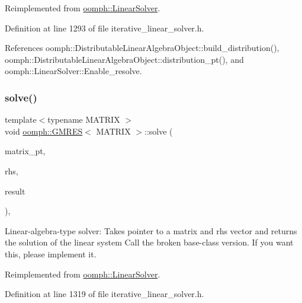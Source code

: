 Reimplemented from \hyperlink{classoomph_1_1LinearSolver_a546c09822d18191df14caed864c04c09}{oomph\+::\+Linear\+Solver}.



Definition at line 1293 of file iterative\+\_\+linear\+\_\+solver.\+h.



References oomph\+::\+Distributable\+Linear\+Algebra\+Object\+::build\+\_\+distribution(), oomph\+::\+Distributable\+Linear\+Algebra\+Object\+::distribution\+\_\+pt(), and oomph\+::\+Linear\+Solver\+::\+Enable\+\_\+resolve.

\mbox{\label{classoomph_1_1GMRES_ab2d5a5beea3383391404a62515a210d9}} 
\subsubsection{\texorpdfstring{solve()}{solve()}\hspace{0.1cm}{\footnotesize\ttfamily [3/3]}}
{\footnotesize\ttfamily template$<$typename M\+A\+T\+R\+IX $>$ \\
void \hyperlink{classoomph_1_1GMRES}{oomph\+::\+G\+M\+R\+ES}$<$ M\+A\+T\+R\+IX $>$\+::solve (\begin{DoxyParamCaption}\item[{\hyperlink{classoomph_1_1DoubleMatrixBase}{Double\+Matrix\+Base} $\ast$const \&}]{matrix\+\_\+pt,  }\item[{const \hyperlink{classoomph_1_1Vector}{Vector}$<$ double $>$ \&}]{rhs,  }\item[{\hyperlink{classoomph_1_1Vector}{Vector}$<$ double $>$ \&}]{result }\end{DoxyParamCaption})\hspace{0.3cm}{\ttfamily [inline]}, {\ttfamily [virtual]}}



Linear-\/algebra-\/type solver\+: Takes pointer to a matrix and rhs vector and returns the solution of the linear system Call the broken base-\/class version. If you want this, please implement it. 



Reimplemented from \hyperlink{classoomph_1_1LinearSolver_a1f7a2ee2cd18d3dafc20a61ca2f52dbb}{oomph\+::\+Linear\+Solver}.



Definition at line 1319 of file iterative\+\_\+linear\+\_\+solver.\+h.



